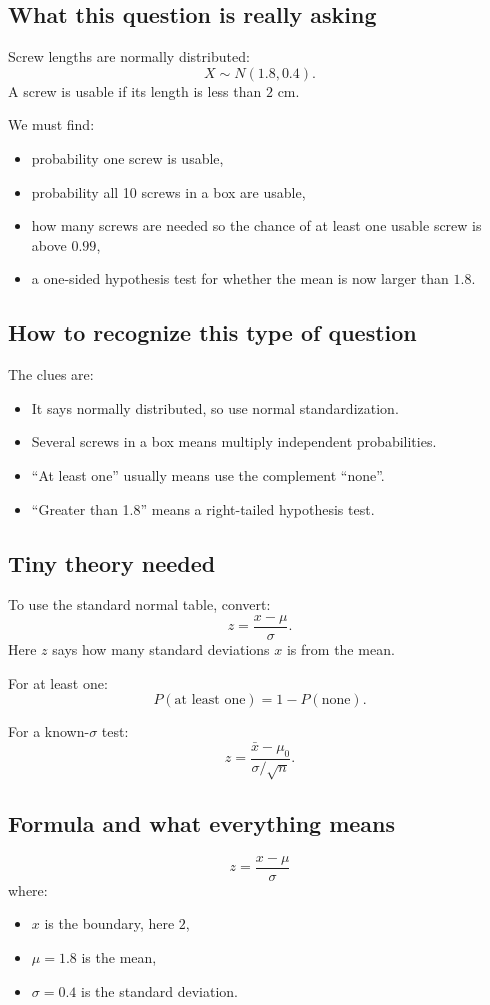 \documentclass[11pt,a4paper]{article}
\begin{document}
\subsection*{What this question is really asking}
Screw lengths are normally distributed:
\[
X\sim N(1.8,0.4).
\]
A screw is usable if its length is less than \(2\) cm.

We must find:
\begin{itemize}[leftmargin=*]
    \item probability one screw is usable,
    \item probability all 10 screws in a box are usable,
    \item how many screws are needed so the chance of at least one usable screw is above \(0.99\),
    \item a one-sided hypothesis test for whether the mean is now larger than \(1.8\).
\end{itemize}

\subsection*{How to recognize this type of question}
The clues are:
\begin{itemize}[leftmargin=*]
    \item It says normally distributed, so use normal standardization.
    \item Several screws in a box means multiply independent probabilities.
    \item ``At least one'' usually means use the complement ``none''.
    \item ``Greater than 1.8'' means a right-tailed hypothesis test.
\end{itemize}

\subsection*{Tiny theory needed}
To use the standard normal table, convert:
\[
z=\frac{x-\mu}{\sigma}.
\]
Here \(z\) says how many standard deviations \(x\) is from the mean.

For at least one:
\[
P(\text{at least one})=1-P(\text{none}).
\]

For a known-\(\sigma\) test:
\[
z=\frac{\bar{x}-\mu_0}{\sigma/\sqrt{n}}.
\]

\subsection*{Formula and what everything means}
\[
z=\frac{x-\mu}{\sigma}
\]
where:
\begin{itemize}[leftmargin=*]
    \item \(x\) is the boundary, here \(2\),
    \item \(\mu=1.8\) is the mean,
    \item \(\sigma=0.4\) is the standard deviation.
\end{itemize}
\end{document}
